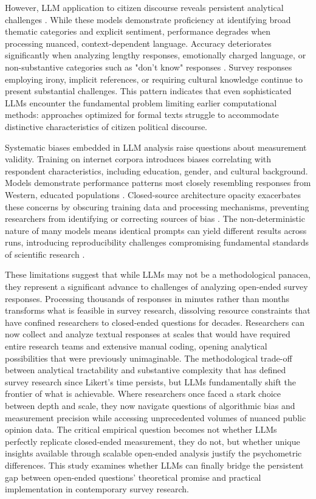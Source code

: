 \documentclass[
  journal=ram,
  manuscript=article-type,
  year=2025,
  volume=unpublished,
]{cup-journal}
\begin{document}
However, LLM application to citizen discourse reveals persistent analytical challenges \citep{m_foisy_etal25}.
While these models demonstrate proficiency at identifying broad thematic categories and explicit sentiment, performance degrades when processing nuanced, context-dependent language.
Accuracy deteriorates significantly when analyzing lengthy responses, emotionally charged language, or non-substantive categories such as "don't know" responses \citep{ashwin_etal23, geiecke_jaravel25}.
Survey responses employing irony, implicit references, or requiring cultural knowledge continue to present substantial challenges.
This pattern indicates that even sophisticated LLMs encounter the fundamental problem limiting earlier computational methods: approaches optimized for formal texts struggle to accommodate distinctive characteristics of citizen political discourse.

Systematic biases embedded in LLM analysis raise questions about measurement validity.
Training on internet corpora introduces biases correlating with respondent characteristics, including education, gender, and cultural background.
Models demonstrate performance patterns most closely resembling responses from Western, educated populations \citep{m_foisy_etal24, gallegos_etal24}.
Closed-source architecture opacity exacerbates these concerns by obscuring training data and processing mechanisms, preventing researchers from identifying or correcting sources of bias \citep{liu_sun23, ashwin_etal23, he_etal24, burstein_etal25}.
The non-deterministic nature of many models means identical prompts can yield different results across runs, introducing reproducibility challenges compromising fundamental standards of scientific research \citep{ouyang_zhang24}.

These limitations suggest that while LLMs may not be a methodological panacea, they represent a significant advance to challenges of analyzing open-ended survey responses.
Processing thousands of responses in minutes rather than months transforms what is feasible in survey research, dissolving resource constraints that have confined researchers to closed-ended questions for decades.
Researchers can now collect and analyze textual responses at scales that would have required entire research teams and extensive manual coding, opening analytical possibilities that were previously unimaginable.
The methodological trade-off between analytical tractability and substantive complexity that has defined survey research since Likert's time persists, but LLMs fundamentally shift the frontier of what is achievable.
Where researchers once faced a stark choice between depth and scale, they now navigate questions of algorithmic bias and measurement precision while accessing unprecedented volumes of nuanced public opinion data.
The critical empirical question becomes not whether LLMs perfectly replicate closed-ended measurement, they do not, but whether unique insights available through scalable open-ended analysis justify the psychometric differences.
This study examines whether LLMs can finally bridge the persistent gap between open-ended questions' theoretical promise and practical implementation in contemporary survey research.
\end{document}
